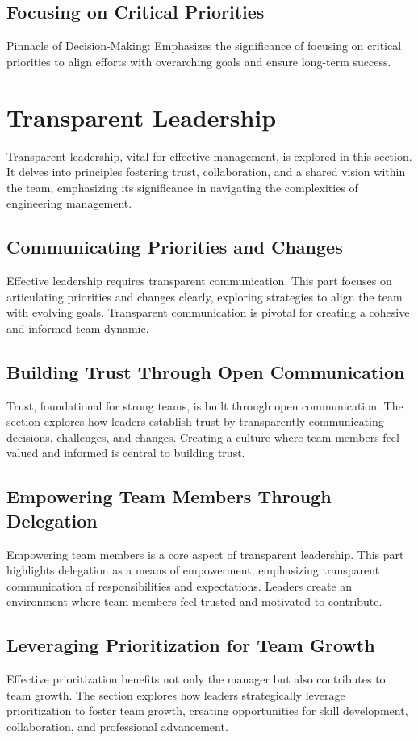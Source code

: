 \documentclass[10pt]{article}
\begin{document}
\subsection{Focusing on Critical Priorities}
Pinnacle of Decision-Making: Emphasizes the significance of focusing on critical priorities to align efforts with overarching goals and ensure long-term success.


\section{Transparent Leadership}
Transparent leadership, vital for effective management, is explored in this section. It delves into principles fostering trust, collaboration, and a shared vision within the team, emphasizing its significance in navigating the complexities of engineering management.

\subsection{Communicating Priorities and Changes}
Effective leadership requires transparent communication. This part focuses on articulating priorities and changes clearly, exploring strategies to align the team with evolving goals. Transparent communication is pivotal for creating a cohesive and informed team dynamic.

\subsection{Building Trust Through Open Communication} 
Trust, foundational for strong teams, is built through open communication. The section explores how leaders establish trust by transparently communicating decisions, challenges, and changes. Creating a culture where team members feel valued and informed is central to building trust.

\subsection{Empowering Team Members Through Delegation} 
Empowering team members is a core aspect of transparent leadership. This part highlights delegation as a means of empowerment, emphasizing transparent communication of responsibilities and expectations. Leaders create an environment where team members feel trusted and motivated to contribute.

\subsection{Leveraging Prioritization for Team Growth} 
Effective prioritization benefits not only the manager but also contributes to team growth. The section explores how leaders strategically leverage prioritization to foster team growth, creating opportunities for skill development, collaboration, and professional advancement.
\end{document}
